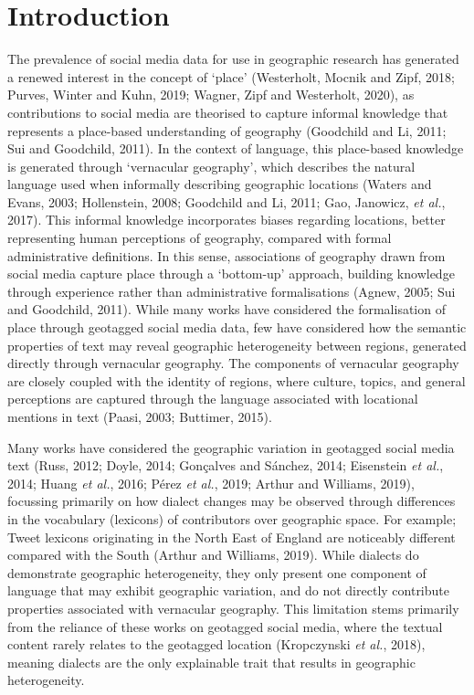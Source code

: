 \documentclass[
  letterpaper,
  11pt,
  english,
  onehalfspacing,
  headsepline]{MastersDoctoralThesis}
\begin{document}
\newpage

\hypertarget{introduction-2}{%
\section{Introduction}\label{introduction-2}}

The prevalence of social media data for use in geographic research has
generated a renewed interest in the concept of `place' (Westerholt,
Mocnik and Zipf, 2018; Purves, Winter and Kuhn, 2019; Wagner, Zipf and
Westerholt, 2020), as contributions to social media are theorised to
capture informal knowledge that represents a place-based understanding
of geography (Goodchild and Li, 2011; Sui and Goodchild, 2011). In the
context of language, this place-based knowledge is generated through
`vernacular geography', which describes the natural language used when
informally describing geographic locations (Waters and Evans, 2003;
Hollenstein, 2008; Goodchild and Li, 2011; Gao, Janowicz, \emph{et al.},
2017). This informal knowledge incorporates biases regarding locations,
better representing human perceptions of geography, compared with formal
administrative definitions. In this sense, associations of geography
drawn from social media capture place through a `bottom-up' approach,
building knowledge through experience rather than administrative
formalisations (Agnew, 2005; Sui and Goodchild, 2011). While many works
have considered the formalisation of place through geotagged social
media data, few have considered how the semantic properties of text may
reveal geographic heterogeneity between regions, generated directly
through vernacular geography. The components of vernacular geography are
closely coupled with the identity of regions, where culture, topics, and
general perceptions are captured through the language associated with
locational mentions in text (Paasi, 2003; Buttimer, 2015).

Many works have considered the geographic variation in geotagged social
media text (Russ, 2012; Doyle, 2014; Gonçalves and Sánchez, 2014;
Eisenstein \emph{et al.}, 2014; Huang \emph{et al.}, 2016; Pérez
\emph{et al.}, 2019; Arthur and Williams, 2019), focussing primarily on
how dialect changes may be observed through differences in the
vocabulary (lexicons) of contributors over geographic space. For
example; Tweet lexicons originating in the North East of England are
noticeably different compared with the South (Arthur and Williams,
2019). While dialects do demonstrate geographic heterogeneity, they only
present one component of language that may exhibit geographic variation,
and do not directly contribute properties associated with vernacular
geography. This limitation stems primarily from the reliance of these
works on geotagged social media, where the textual content rarely
relates to the geotagged location (Kropczynski \emph{et al.}, 2018),
meaning dialects are the only explainable trait that results in
geographic heterogeneity.
\end{document}
